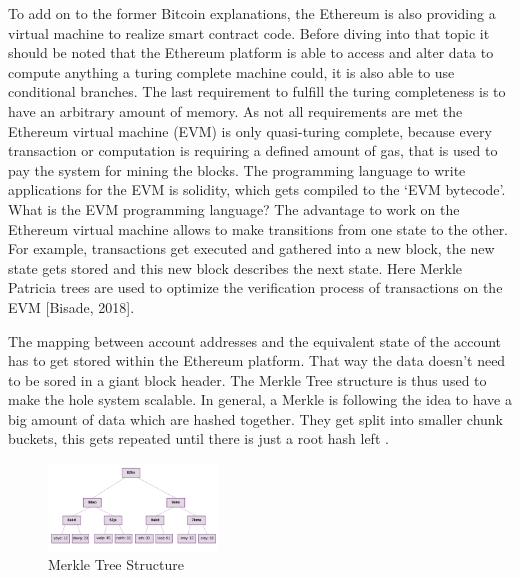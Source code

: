To add on to the former Bitcoin explanations, the Ethereum is also providing a virtual machine to realize smart contract code. 
Before diving into that topic it should be noted that the Ethereum platform is able to access and alter data to compute anything a turing complete machine could, it is also able to use conditional branches. 
The last requirement to fulfill the turing completeness is to have an arbitrary amount of memory. 
As not all requirements are met the Ethereum virtual machine (EVM) is only quasi-turing complete, because every transaction or computation is requiring a defined amount of gas, that is used to pay the system for mining the blocks. 
The programming language to write applications for the EVM is solidity, which gets compiled to the ‘EVM bytecode’. 
What is the EVM programming language?
The advantage to work on the Ethereum virtual machine allows to make transitions from one state to the other. For example, transactions get executed and gathered into a new block, the new state gets stored and this new block describes the next state.
Here Merkle Patricia trees are used to optimize the verification process of transactions on the EVM [Bisade, 2018].

The mapping between account addresses and the equivalent state of the account has to get stored within the Ethereum platform. That way the data doesn’t need to be sored in a giant block header.
The Merkle Tree structure is thus used to make the hole system scalable. 
In general, a Merkle is following the idea to have a big amount of data which are hashed together. 
They get split into smaller chunk buckets, this gets repeated until there is just a root hash left \cite{Buterin2015}.

\begin{figure}[ht]
\centering 
\caption{Merkle Tree Structure}
\includegraphics[width=0.4\textwidth]{MerkleTree1}
\end{figure}

